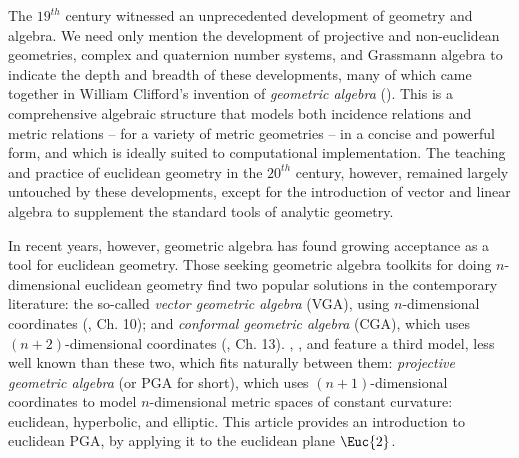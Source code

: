 \documentclass{birkjour}
\begin{document}
The $19^{th}$ century witnessed an unprecedented development of geometry and algebra.  We need only mention the development of projective and non-euclidean geometries, complex and quaternion number systems, and Grassmann algebra to indicate the depth and breadth of these developments, many of which came together in William Clifford's invention of \emph{geometric algebra} (\cite{clifford78}).  This is a  comprehensive algebraic structure that models both incidence relations and metric relations -- for a variety of metric geometries -- in a concise and powerful form, and which is  ideally suited to computational implementation. The teaching and practice of euclidean  geometry in the $20^{th}$ century, however, remained largely untouched by these developments, except for the introduction of vector and linear algebra to supplement the standard tools of analytic geometry.    %

In recent years, however,  geometric algebra  has found growing acceptance as a tool for euclidean geometry. Those seeking geometric algebra toolkits for doing $n$-dimensional euclidean geometry  find two popular solutions in the contemporary literature:    the  so-called \emph{vector geometric algebra}  (VGA), using $n$-dimensional coordinates (\cite{dfm07}, Ch. 10); and  \emph{conformal geometric algebra} (CGA), which uses $(n+2)$-dimensional coordinates (\cite{dfm07}, Ch. 13). \cite{gunn2011}, \cite{gunnFull2010}, and \cite{gunn2016} feature a third model, less well known than these two, which fits naturally between them:  \emph{projective geometric algebra} (or PGA for short), which uses $(n+1)$-dimensional coordinates to model $n$-dimensional metric spaces of constant curvature: euclidean, hyperbolic, and elliptic.   This article provides an introduction to euclidean PGA, by applying it to the euclidean plane $\Euc{2}$. 
\end{document}
